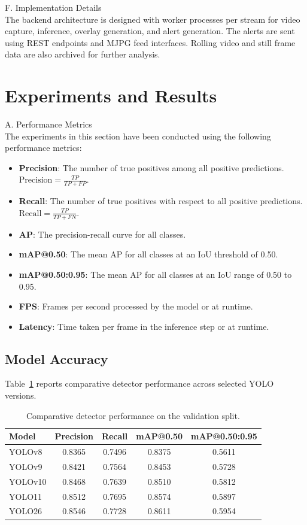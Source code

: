 \documentclass[conference]{IEEEtran}
\begin{document}
F. Implementation Details\\
The backend architecture is designed with worker processes per stream for video capture, inference, overlay generation, and alert generation. The alerts are sent using REST endpoints and MJPG feed interfaces. Rolling video and still frame data are also archived for further analysis.


\section{Experiments and Results}
A. Performance Metrics\\
The experiments in this section have been conducted using the following performance metrics:
\begin{itemize}
\item \textbf{Precision}: The number of true positives among all positive predictions. \\ $\text{Precision} = \frac{TP}{TP + FP}$.
\item \textbf{Recall}: The number of true positives with respect to all positive predictions. \\ $\text{Recall} = \frac{TP}{TP + FN}$.
\item \textbf{AP}: The precision-recall curve for all classes.
\item \textbf{mAP@0.50}: The mean AP for all classes at an IoU threshold of 0.50.
\item \textbf{mAP@0.50:0.95}: The mean AP for all classes at an IoU range of 0.50 to 0.95.
\item \textbf{FPS}: Frames per second processed by the model or at runtime.
\item \textbf{Latency}: Time taken per frame in the inference step or at runtime.
\end{itemize}

\subsection{Model Accuracy}
Table~\ref{tab:results} reports comparative detector performance across selected YOLO versions.

\begin{table}[!htbp]
\caption{Comparative detector performance on the validation split.}
\label{tab:results}
\centering
\begin{tabular}{lcccc}
\toprule
\textbf{Model} & \textbf{Precision} & \textbf{Recall} & \textbf{mAP@0.50} & \textbf{mAP@0.50:0.95}\\
\midrule
YOLOv8 & 0.8365 & 0.7496 & 0.8375 & 0.5611\\
YOLOv9 & 0.8421 & 0.7564 & 0.8453 & 0.5728\\
YOLOv10 & 0.8468 & 0.7639 & 0.8510 & 0.5812\\
YOLO11 & 0.8512 & 0.7695 & 0.8574 & 0.5897\\
YOLO26 & 0.8546 & 0.7728 & 0.8611 & 0.5954\\
\bottomrule
\end{tabular}
\end{table}
\end{document}
